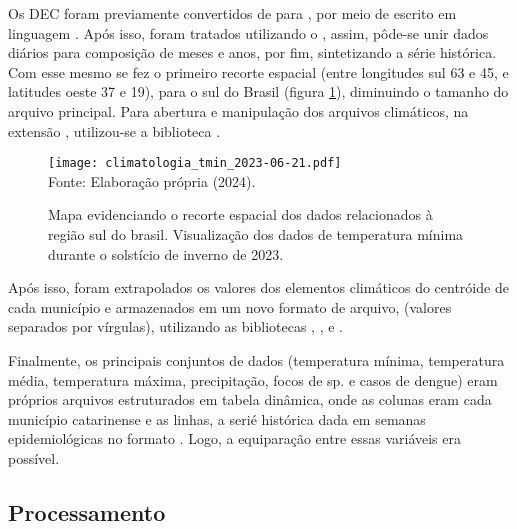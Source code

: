 \indent Os \acrshort{DEC} foram previamente convertidos de  para , por meio de  escrito em linguagem  \cite{shell_1999_heroldlinux, bash_2007_gnu-free}. Após isso, foram tratados utilizando o  \cite{CDO_2023_schulzweida}, assim, pôde-se unir dados diários para composição de meses e anos, por fim, sintetizando a série histórica. Com esse mesmo  se fez o primeiro recorte espacial (entre longitudes sul 63 e 45, e latitudes oeste 37 e 19), para o sul do Brasil (figura \ref{fig: sul_brasil}), diminuindo o tamanho do arquivo principal. Para abertura e manipulação dos arquivos climáticos, na extensão , utilizou-se a biblioteca  \cite{xarray_2016_v0_8_0, xarray_2017_hoyer}.

\begin{figure}[htbp]
    \centering
    \caption{Mapa evidenciando o recorte espacial dos dados relacionados à região sul do brasil. Visualização dos dados de temperatura mínima durante o solstício de inverno de 2023.}
    \texttt{[image: climatologia\_tmin\_2023-06-21.pdf]}
    \label{fig: sul_brasil}
    \\
    \vspace{-0.05cm}\hspace{-7.5cm}\small{Fonte: Elaboração própria (2024).} 
\end{figure}

\indent Após isso, foram extrapolados os valores dos elementos climáticos do centróide de cada município e armazenados em um novo formato de arquivo,  (valores separados por vírgulas), utilizando as bibliotecas , ,  e  \cite{shapely_2007_gillies}.

\indent Finalmente,  os principais conjuntos de dados (temperatura mínima, temperatura média, temperatura máxima, precipitação, focos de  sp. e casos de dengue) eram próprios arquivos estruturados em tabela dinâmica, onde as colunas eram cada município catarinense e as linhas, a serié histórica dada em semanas epidemiológicas no formato . Logo, a equiparação entre essas variáveis era possível.

\subsection{Processamento}

